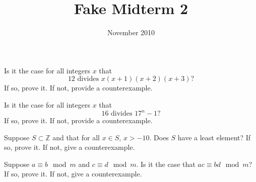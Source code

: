 \documentclass[12pt]{midterm}
\title{Fake Midterm 2}
\date{November 2010}
\begin{document}
\begin{exam}

\begin{problem}[360]
Is it the case for all integers $x$ that
$$
12 \mbox{ divides } x(x+1)(x+2)(x+3)?
$$
If so, prove it.  If not, provide a counterexample.
\end{problem}

\begin{solution}\begin{solutiontext}
\end{solutiontext}\end{solution}

\begin{problem}[360]
Is it the case for all integers $x$ that
$$
16 \mbox{ divides } 17^n - 1?
$$
If so, prove it.  If not, provide a counterexample.
\end{problem}

\begin{solution}\begin{solutiontext}
\end{solutiontext}\end{solution}

\begin{problem}[360]
  Suppose $S \subset \mathbb{Z}$ and that for all $x \in S$, $x >
  -10$.  Does $S$ have a least element?  If so, prove it.  If not,
  give a counterexample.
\end{problem}

\begin{solution}\begin{solutiontext}
\end{solutiontext}\end{solution}

\begin{problem}[360]
  Suppose $a \equiv b \mod m$ and $c \equiv d \mod m$.  Is it the case
  that $ac \equiv bd \mod m$?  If so, prove it.  If not, give a
  counterexample.
\end{problem}

\begin{solution}\begin{solutiontext}
\end{solutiontext}\end{solution}


\end{exam}
\end{document}
